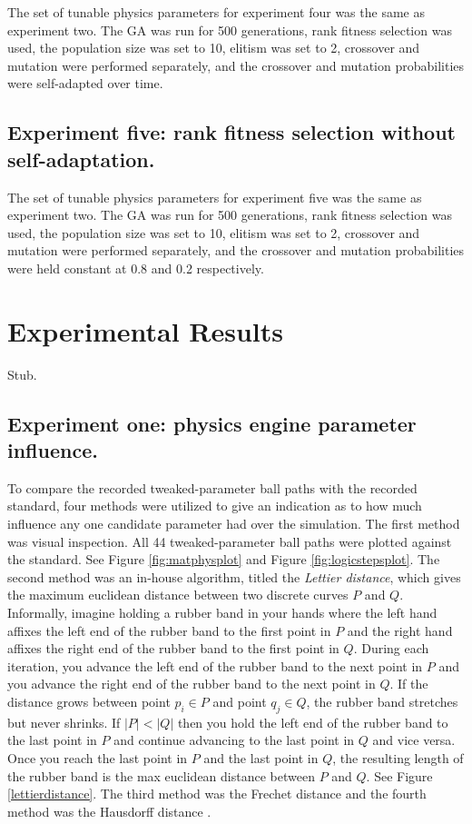 The set of tunable physics parameters for experiment four was the same as experiment two. The GA was run for 500 generations, rank fitness selection was used, the population size was set to 10, elitism was set to 2, crossover and mutation were performed separately, and the crossover and mutation probabilities were self-adapted over time.

\subsection[Experiment Five]{Experiment five: rank fitness selection without self-adaptation.}

The set of tunable physics parameters for experiment five was the same as experiment two. The GA was run for 500 generations, rank fitness selection was used, the population size was set to 10, elitism was set to 2, crossover and mutation were performed separately, and the crossover and mutation probabilities were held constant at 0.8 and 0.2 respectively.

\section{Experimental Results}

Stub.

\subsection[Experiment One]{Experiment one: physics engine parameter influence.}

To compare the recorded tweaked-parameter ball paths with the recorded standard, four methods were utilized to give an indication as to how much influence any one candidate parameter had over the simulation. The first method was visual inspection. All 44 tweaked-parameter ball paths were plotted against the standard. See Figure \ref{fig:matphysplot} and Figure \ref{fig:logicstepsplot}. The second method was an in-house algorithm, titled the \textit{Lettier distance}, which gives the maximum euclidean distance between two discrete curves $P$ and $Q$. Informally, imagine holding a rubber band in your hands where the left hand affixes the left end of the rubber band to the first point in $P$ and the right hand affixes the right end of the rubber band to the first point in $Q$. During each iteration, you advance the left end of the rubber band to the next point in $P$ and you advance the right end of the rubber band to the next point in $Q$. If the distance grows between point $p_i\in P$ and point $q_j \in Q$, the rubber band stretches but never shrinks. If $|P|<|Q|$ then you hold the left end of the rubber band to the last point in $P$ and continue advancing to the last point in $Q$ and vice versa. Once you reach the last point in $P$ and the last point in $Q$, the resulting length of the rubber band is the max euclidean distance between $P$ and $Q$. See Figure \ref{lettierdistance}. The third method was the Frechet distance and the fourth method was the Hausdorff distance \cite{frechet} \cite{hausdorff}.

